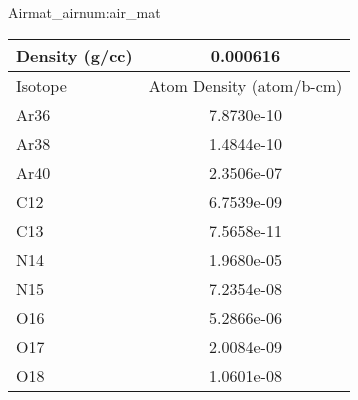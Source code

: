 \begin{matitem}{Air}{mat_air}{num:air_mat}
  \centering
  \begin{tabular}{l c}
    \toprule
    Density (g/cc) & 0.000616 \\
    \midrule
    Isotope & Atom Density (atom/b-cm) \\
    \midrule
    \midrule
Ar36 & 7.8730e-10 \\
Ar38 & 1.4844e-10 \\
Ar40 & 2.3506e-07 \\
C12 & 6.7539e-09 \\
C13 & 7.5658e-11 \\
N14 & 1.9680e-05 \\
N15 & 7.2354e-08 \\
O16 & 5.2866e-06 \\
O17 & 2.0084e-09 \\
O18 & 1.0601e-08 \\

    \bottomrule
  \end{tabular}
\end{matitem}
